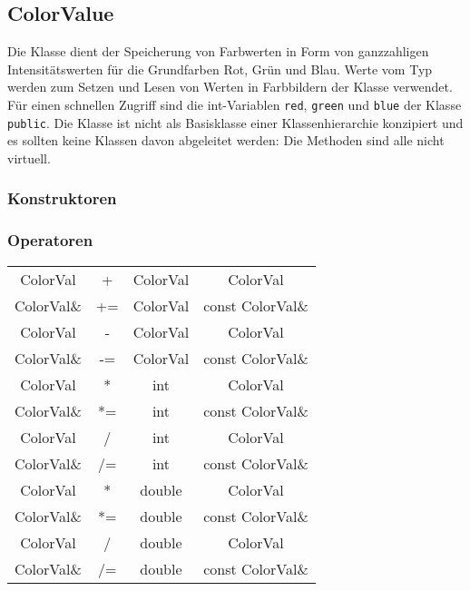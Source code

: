 
\subsection{ColorValue}
\hypertarget{ColorValue}{}
Die Klasse  dient der Speicherung von Farbwerten in Form
von ganzzahligen Intensitätswerten für die Grundfarben Rot, Grün und 
Blau. Werte vom Typ  werden zum Setzen und Lesen von 
Werten in Farbbildern der Klasse  verwendet. Für 
einen schnellen Zugriff 
sind die int-Variablen \verb+red+, \verb+green+ und \verb+blue+ der 
Klasse \verb+public+. Die Klasse  ist nicht 
als Basisklasse einer Klassenhierarchie konzipiert und es sollten keine
Klassen davon abgeleitet werden: Die Methoden sind alle nicht virtuell.

\subsubsection{Konstruktoren}




\subsubsection{Operatoren}

\begin{center}
\begin{tabular}{ccc@{=}c}
ColorVal & + & ColorVal & ColorVal\\
ColorVal\& & += & ColorVal & const ColorVal\&\\
ColorVal & - & ColorVal & ColorVal\\
ColorVal\& & -= & ColorVal & const ColorVal\&\\
ColorVal & * & int & ColorVal\\
ColorVal\& & *= & int & const ColorVal\&\\
ColorVal & / & int & ColorVal\\
ColorVal\& & /= & int & const ColorVal\&\\
ColorVal & * & double & ColorVal\\
ColorVal\& & *= & double & const ColorVal\&\\
ColorVal & / & double & ColorVal\\
ColorVal\& & /= & double & const ColorVal\&\\
\end{tabular}
\end{center}

